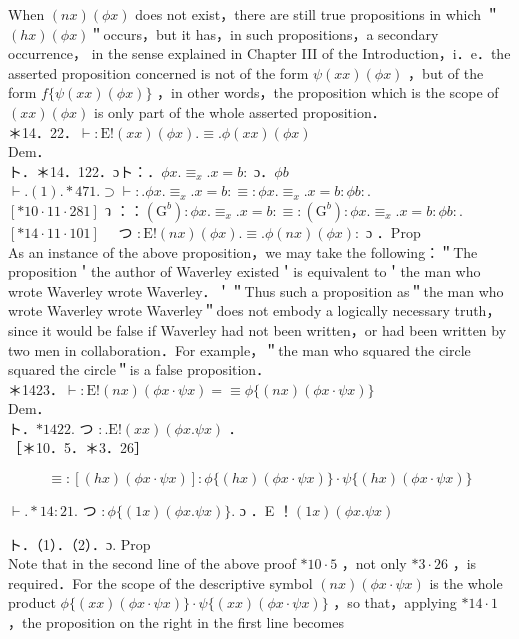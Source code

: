 \documentclass[10pt]{article}
\begin{document}
When $(n x)(\phi x)$ does not exist，there are still true propositions in which ＂$(h x)(\phi x)$＂occurs，but it has，in such propositions，a secondary occurrence， in the sense explained in Chapter III of the Introduction，i．e．the asserted proposition concerned is not of the form $\psi(x x)(\phi x)$ ，but of the form $f\{\psi(x x)(\phi x)\}$ ，in other words，the proposition which is the scope of $(x x)(\phi x)$ is only part of the whole asserted proposition．\\
＊14．22．$\vdash: \mathrm{E}!(x x)(\phi x) . \equiv . \phi(x x)(\phi x)$\\
Dem．\\
ト．＊14．122．ɔト：．$\phi x . \equiv_{x} . x=b:$ ɔ．$\phi b$\\
$\vdash .(1) . * 471 . \supset \vdash: . \phi x . \equiv_{x} . x=b: \equiv: \phi x . \equiv_{x} . x=b: \phi b:$.\\
$[* 10 \cdot 11 \cdot 281]$ ว ：：$\left(\mathrm{G}^{b}\right): \phi x . \equiv_{x} . x=b: \equiv:\left(\mathrm{G}^{b}\right): \phi x . \equiv_{x} . x=b: \phi b:$.\\
$[* 14 \cdot 11 \cdot 101] \quad$ つ $: \mathrm{E}!(n x)(\phi x) . \equiv . \phi(n x)(\phi x):$ ɔ ．Prop\\
As an instance of the above proposition，we may take the following：＂The proposition＇the author of Waverley existed＇is equivalent to＇the man who wrote Waverley wrote Waverley．＇＂Thus such a proposition as＂the man who wrote Waverley wrote Waverley＂does not embody a logically necessary truth，since it would be false if Waverley had not been written，or had been written by two men in collaboration．For example，＂the man who squared the circle squared the circle＂is a false proposition．\\
＊1423．$\vdash: \mathrm{E}!(n x)(\phi x \cdot \psi x)=\equiv \phi\{(n x)(\phi x \cdot \psi x)\}$\\
Dem．\\
ト．$* 1422$. つ $: . \mathrm{E}!(x x)(\phi x . \psi x)$ ．\\
［＊10．5．＊3．26］


\begin{equation*}
\equiv:[(h x)(\phi x \cdot \psi x)]: \phi\{(h x)(\phi x \cdot \psi x)\} \cdot \psi\{(h x)(\phi x \cdot \psi x)\} \tag{1}
\end{equation*}


$\vdash . * 14: 21$. つ $: \phi\{(1 x)(\phi x . \psi x)\}$. ɔ ．E ！$(1 x)(\phi x . \psi x)$

ト．（1）．（2）．ɔ. Prop\\
Note that in the second line of the above proof $* 10 \cdot 5$ ，not only $* 3 \cdot 26$ ，is required．For the scope of the descriptive symbol $(n x)(\phi x \cdot \psi x)$ is the whole product $\phi\{(x x)(\phi x \cdot \psi x)\} \cdot \psi\{(x x)(\phi x \cdot \psi x)\}$ ，so that，applying $* 14 \cdot 1$ ，the proposition on the right in the first line becomes
\end{document}
